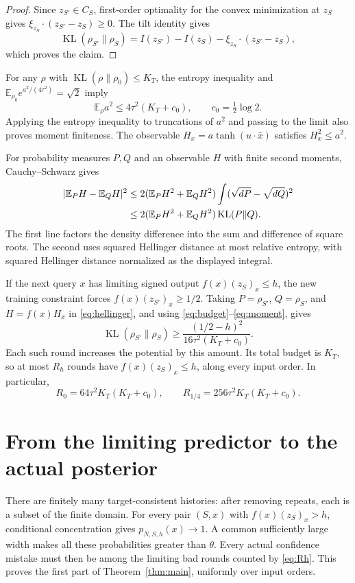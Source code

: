 \documentclass[11pt]{article}
\newcommand{\E}{\mathbb E}
\newcommand{\KL}{\operatorname{KL}}
\begin{document}
\begin{proof}
Since $z_{S'}\in C_S$, first-order optimality for the convex minimization
at $z_S$ gives $\xi_{z_S}\cdot(z_{S'}-z_S)\ge0$. The tilt identity gives
\[
 \KL(\rho_{S'}\|\rho_S)
  =I(z_{S'})-I(z_S)-\xi_{z_S}\cdot(z_{S'}-z_S),
\]
which proves the claim.
\end{proof}

For any $\rho$ with $\KL(\rho\|\rho_0)\le K_T$, the entropy inequality
and $\E_{\rho_0}e^{a^2/(4\tau^2)}=\sqrt2$ imply
\begin{equation}\label{eq:moment}
 \E_\rho a^2\le4\tau^2(K_T+c_0),\qquad c_0=\tfrac12\log2.
\end{equation}
Applying the entropy inequality to truncations of $a^2$ and passing to
the limit also proves moment finiteness. The observable
$H_x=a\tanh(u\cdot\bar x)$ satisfies $H_x^2\le a^2$.

For probability measures $P,Q$ and an observable $H$ with finite second
moments, Cauchy--Schwarz gives
\begin{align}
 |\E_PH-\E_QH|^2
 &\le2(\E_PH^2+\E_QH^2)
       \int(\sqrt{dP}-\sqrt{dQ})^2\notag\\
 &\le2(\E_PH^2+\E_QH^2)\KL(P\|Q).
 \label{eq:hellinger}
\end{align}
The first line factors the density difference into the sum and difference
of square roots. The second uses squared Hellinger distance at most
relative entropy, with squared Hellinger distance normalized as the
displayed integral.

If the next query $x$ has limiting signed output $f(x)(z_S)_x\le h$,
the new training constraint forces $f(x)(z_{S'})_x\ge1/2$. Taking
$P=\rho_{S'}$, $Q=\rho_S$, and $H=f(x)H_x$ in
\eqref{eq:hellinger}, and using \eqref{eq:budget}--\eqref{eq:moment},
gives
\begin{equation}\label{eq:payment}
 \KL(\rho_{S'}\|\rho_S)
 \ge\frac{(1/2-h)^2}{16\tau^2(K_T+c_0)}.
\end{equation}
Each such round increases the potential by this amount. Its total budget
is $K_T$, so at most $R_h$ rounds have $f(x)(z_S)_x\le h$, along every
input order. In particular,
\[
 R_0=64\tau^2K_T(K_T+c_0),\qquad
 R_{1/4}=256\tau^2K_T(K_T+c_0).
\]

\section{From the limiting predictor to the actual posterior}

There are finitely many target-consistent histories: after removing
repeats, each is a subset of the finite domain. For every pair $(S,x)$
with $f(x)(z_S)_x>h$, conditional concentration gives
$p_{N,S,h}(x)\to1$. A common sufficiently large width makes all these
probabilities greater than $\theta$. Every actual confidence mistake
must then be among the limiting bad rounds counted by \eqref{eq:Rh}.
This proves the first part of Theorem~\ref{thm:main}, uniformly over
input orders.
\end{document}
